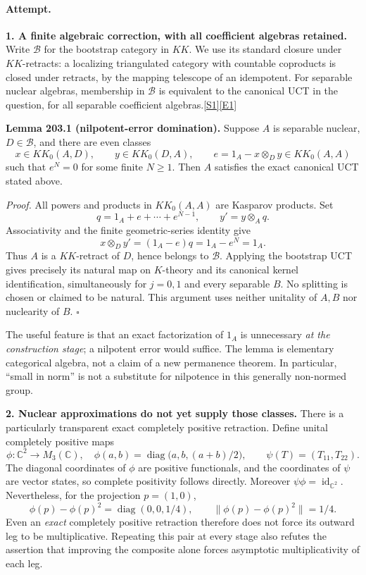 \documentclass[11pt,a4paper]{article}
\newcommand{\C}{\mathbb{C}}
\newcommand{\sref}[2]{\hyperlink{source:#1:#2}{[S#2]}}
\newcommand{\eref}[2]{\hyperlink{extra:#1:#2}{[E#2]}}
\begin{document}
\paragraph{Attempt.}
\textbf{1. A finite algebraic correction, with all coefficient algebras retained.}
Write $\mathcal B$ for the bootstrap category in $KK$. We use its standard
closure under $KK$-retracts: a localizing triangulated category with
countable coproducts is closed under retracts, by the mapping telescope of
an idempotent. For separable nuclear algebras, membership in $\mathcal B$
is equivalent to the canonical UCT in the question, for all separable
coefficient algebras.\sref{30006980}{1}\eref{30006980}{1}

\textbf{Lemma 203.1 (nilpotent-error domination).}
Suppose $A$ is separable nuclear, $D\in\mathcal B$, and there are even
classes
\[
 x\in KK_0(A,D),\qquad y\in KK_0(D,A),\qquad
 e=1_A-x\otimes_Dy\in KK_0(A,A)
\]
such that $e^N=0$ for some finite $N\ge1$. Then $A$ satisfies the exact
canonical UCT stated above.

\emph{Proof.}
All powers and products in $KK_0(A,A)$ are Kasparov products. Set
\[
 q=1_A+e+\cdots+e^{N-1},\qquad y'=y\otimes_Aq.
\]
Associativity and the finite geometric-series identity give
\[
 x\otimes_Dy'=(1_A-e)q=1_A-e^N=1_A.
\]
Thus $A$ is a $KK$-retract of $D$, hence belongs to $\mathcal B$. Applying
the bootstrap UCT gives precisely its natural map on $K$-theory and its
canonical kernel identification, simultaneously for $j=0,1$ and every
separable $B$. No splitting is chosen or claimed to be natural.
This argument uses neither unitality of $A,B$ nor nuclearity of $B$.
\hfill$\square$

The useful feature is that an exact factorization of $1_A$ is unnecessary
\emph{at the construction stage}; a nilpotent error would suffice. The
lemma is elementary categorical algebra, not a claim of a new permanence
theorem. In particular, ``small in norm'' is not a substitute for
nilpotence in this generally non-normed group.

\textbf{2. Nuclear approximations do not yet supply those classes.}
There is a particularly transparent exact completely positive retraction.
Define unital completely positive maps
\[
 \phi:\C^2\longrightarrow M_3(\C),\quad
 \phi(a,b)=\operatorname{diag}\bigl(a,b,(a+b)/2\bigr),
 \qquad
 \psi(T)=(T_{11},T_{22}).
\]
The diagonal coordinates of $\phi$ are positive functionals, and the
coordinates of $\psi$ are vector states, so complete positivity follows
directly. Moreover $\psi\phi=\operatorname{id}_{\C^2}$. Nevertheless,
for the projection $p=(1,0)$,
\[
 \phi(p)-\phi(p)^2=\operatorname{diag}(0,0,1/4),\qquad
 \|\phi(p)-\phi(p)^2\|=1/4.
\]
Even an \emph{exact} completely positive retraction therefore does not force
its outward leg to be multiplicative. Repeating this pair at every stage
also refutes the assertion that improving the composite alone forces
asymptotic multiplicativity of each leg.
\end{document}
